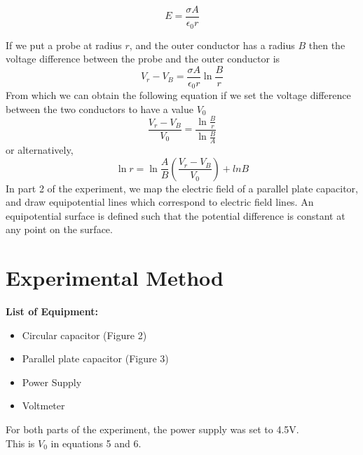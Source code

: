 \documentclass[letterpaper]{article}
\begin{document}
\begin{equation}
  E=\frac{\sigma A}{\epsilon_0 r}
\end{equation}

If we put a probe at radius $r$, and the outer conductor has a radius $B$ then the voltage
difference between the probe and the outer conductor is
\begin{equation}
  V_r-V_B=\frac{\sigma A}{\epsilon_0 r} \ln{\frac{B}{r}}
\end{equation}
From which we can obtain the following equation if we set the voltage difference between the two conductors to have a value $V_0$
\begin{equation}
  \frac{V_r-V_B}{V_0}=\frac{\ln{\frac{B}{r}}}{\ln{\frac{B}{A}}}
\end{equation}
or alternatively,
\begin{equation}
  \ln{r} =\ln{\frac{A}{B}}(\frac{V_r-V_B}{V_0}) + ln{B}
\end{equation}
In part 2 of the experiment, we map the electric field of a parallel plate capacitor, and draw equipotential lines
which correspond to electric field lines. An equipotential surface is defined such that the
potential difference is constant at any point on the surface.


\section{Experimental Method}

\textbf{List of Equipment:}
\begin{itemize}
  \item Circular capacitor (Figure 2)
  \item Parallel plate capacitor (Figure 3)
  \item Power Supply
  \item Voltmeter
\end{itemize}
For both parts of the experiment, the power supply was set to 4.5V. \\This is $V_0$ in equations 5 and 6.
\newpage
\end{document}
